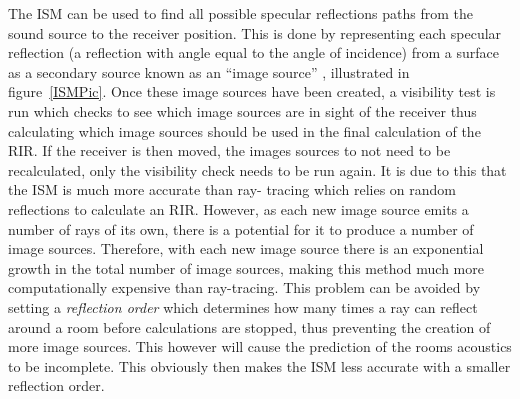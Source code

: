 \documentclass[../../main.tex]{subfiles}
\begin{document}

			The \ac{ISM} can be used to find all possible specular reflections paths from the sound source to the receiver position. This is done by representing each specular reflection (a reflection with angle equal to the angle of incidence) from a surface as a secondary source known as an ``image source'' \cite{Rindel1995}, illustrated in figure~\ref{ISMPic}. Once these image sources have been created, a visibility test is run which checks to see which image sources are in sight of the receiver thus calculating which image sources should be used in the final calculation of the \ac{RIR}. If the receiver is then moved, the images sources to not need to be recalculated, only the visibility check needs to be run again. It is due to this that the \ac{ISM} is much more accurate than ray- tracing which relies on random reflections to calculate an \ac{RIR}. However, as each new image source emits a number of rays of its own, there is a potential for it to produce a number of image sources. Therefore, with each new image source there is an exponential growth in the total number of image sources, making this method much more computationally expensive than ray-tracing. This problem can be avoided by setting a \textit{reflection order} which determines how many times a ray can reflect around a room before calculations are stopped, thus preventing the creation of more image sources. This however will cause the prediction of the rooms acoustics to be incomplete. This obviously then makes the \ac{ISM} less accurate with a smaller reflection order.
\end{document}
